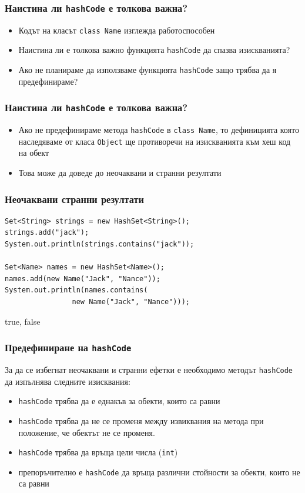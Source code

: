 \documentclass[ignorenonframetext, hyperref=unicode,compress]{beamer}
\begin{document}
\begin{frame}[containsverbatim]\frametitle{Наистина ли \lstinline{hashCode} е толкова важна?}
\begin{itemize}
 \item Кодът на класът \lstinline{class Name} изглежда работоспособен
 \item Наистина ли е толкова важно функцията \lstinline{hashCode} да спазва изискванията?
 \item Ако не планираме да използваме функцията \lstinline{hashCode} защо трябва да я предефинираме?
\end{itemize}
\end{frame}

\begin{frame}[containsverbatim]\frametitle{Наистина ли \lstinline{hashCode} е толкова важна?}
\begin{itemize}
 \item Ако не предефинираме метода \lstinline{hashCode} в \lstinline{class Name}, то дефиницията която наследяваме от класа \lstinline{Object} ще противоречи на изискванията към хеш код на обект
 \item Това може да доведе до неочаквани и странни резултати
\end{itemize}
\end{frame}

\begin{frame}[containsverbatim]\frametitle{Неочаквани странни резултати}
\begin{lstlisting}
Set<String> strings = new HashSet<String>();
strings.add("jack");
System.out.println(strings.contains("jack"));

Set<Name> names = new HashSet<Name>();
names.add(new Name("Jack", "Nance"));
System.out.println(names.contains(
				new Name("Jack", "Nance")));
\end{lstlisting}
{\color{blue} true, false}
\end{frame}

\begin{frame}[containsverbatim]\frametitle{Предефиниране на \lstinline{hashCode}}
За да се избегнат неочаквани и странни ефетки е необходимо методът \lstinline{hashCode} да изпълнява следните изисквания:
\begin{itemize}
 \item \lstinline{hashCode} трябва да е еднакъв за обекти, които са равни
 \item \lstinline{hashCode} трябва да не се променя между извиквания на метода при положение, че обектът не се променя.
 \item \lstinline{hashCode} трябва да връща цели числа (\lstinline{int})
 \item препоръчително е \lstinline{hashCode} да връща различни стойности за обекти, които не са равни
\end{itemize}
\end{frame}
\end{document}
